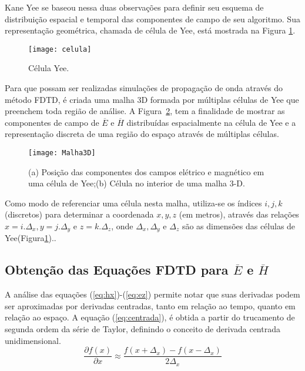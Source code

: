 	Kane Yee se baseou nessa duas observações para definir seu esquema  de distribuição espacial  e temporal das componentes de campo de seu algoritmo. Sua representação geométrica, chamada de célula de Yee, está mostrada na Figura \ref{fg:celulaYee}\cite{rodrigo}.

\begin{figure}[ht!]
\centering
	\texttt{[image: celula]}
	\caption{Célula Yee.}
	\label{fg:celulaYee}
\end{figure} 
		
	Para que possam ser realizadas simulações de propagação de onda através do método FDTD, é criada uma malha 3D formada por múltiplas células de Yee que preenchem toda região de análise. A Figura~\ref{fg:grade}\cite{almeida}, tem a finalidade de mostrar as componentes de campo de $\overline{E}$ e $\overline{H}$ distribuídas espacialmente na célula de Yee e a representação discreta de uma região do espaço através de múltiplas células.

\begin{figure}[ht!]
	\centering
	\texttt{[image: Malha3D]}
	\caption{(a) Posição das componentes dos campos elétrico e magnético em uma célula de Yee;(b) Célula no interior de uma malha 3-D.}
	\label{fg:grade}
\end{figure} 

	Como modo de referenciar uma célula nesta malha, utiliza-se os índices $i,j,k$ (discretos) para determinar a coordenada $x,y,z$ (em metros), através das relações $x = i.\Delta_x, y = j.\Delta_{y}$ e $z = k.\Delta_z$, onde  $\Delta_x,  \Delta_y$ e $\Delta_z$ são as dimensões das células de Yee(Figura\ref{fg:celulaYee})..

\subsection{Obtenção das Equações FDTD para $\overline{E}$ e $\overline{H}$}

	A análise das equações (\ref{eq:hx})-(\ref{eq:ez}) permite notar que suas derivadas podem ser aproximadas por derivadas centradas, tanto em relação ao tempo, quanto em relação ao espaço. A equação (\ref{eq:centrada}), é obtida a partir do trucamento de segunda ordem da série de Taylor, definindo o conceito de derivada centrada unidimensional.
\begin{equation}\label{eq:centrada}
	\frac{\partial f(x)}{\partial{x}} \approx \frac{f(x+\Delta_{x})-f(x-\Delta_{x})}{2\Delta_{x}}
\end{equation}

